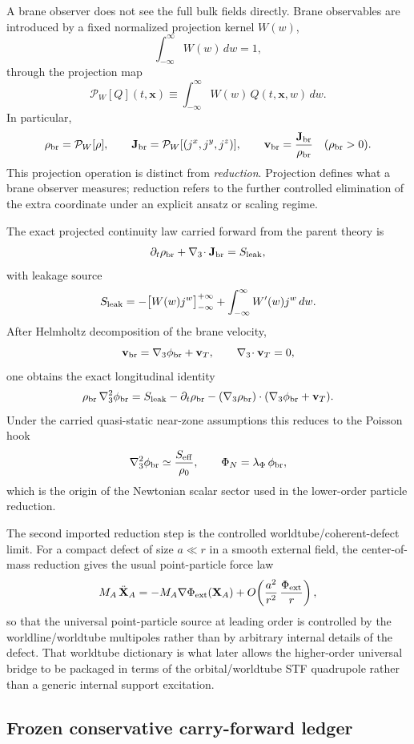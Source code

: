 \documentclass[11pt]{article}
\begin{document}
A brane observer does not see the full bulk fields directly.  Brane observables
are introduced by a fixed normalized projection kernel $W(w)$,
\[
\int_{-\infty}^{\infty} W(w)\,dw = 1,
\]
through the projection map
\[
\mathcal P_W[Q](t,\mathbf{x})
\equiv
\int_{-\infty}^{\infty} W(w)\,Q(t,\mathbf{x},w)\,dw.
\]
In particular,
\[
\rho_{\rm br}=\mathcal P_W[\rho],
\qquad
\mathbf J_{\rm br}=\mathcal P_W[(j^x,j^y,j^z)],
\qquad
\mathbf v_{\rm br}=\frac{\mathbf J_{\rm br}}{\rho_{\rm br}}
\quad (\rho_{\rm br}>0).
\]
This projection operation is distinct from \emph{reduction}.  Projection defines
what a brane observer measures; reduction refers to the further controlled
elimination of the extra coordinate under an explicit ansatz or scaling regime.

The exact projected continuity law carried forward from the parent theory is
\[
\partial_t\rho_{\rm br}+\nabla_3\!\cdot\mathbf J_{\rm br}=S_{\rm leak},
\]
with leakage source
\[
S_{\rm leak}
=
-\bigl[W(w)j^w\bigr]_{-\infty}^{+\infty}
+
\int_{-\infty}^{\infty} W'(w)j^w\,dw.
\]
After Helmholtz decomposition of the brane velocity,
\[
\mathbf v_{\rm br}=\nabla_3\phi_{\rm br}+\mathbf v_T,
\qquad
\nabla_3\!\cdot\mathbf v_T=0,
\]
one obtains the exact longitudinal identity
\[
\rho_{\rm br}\,\nabla_3^2\phi_{\rm br}
=
S_{\rm leak}
-\partial_t\rho_{\rm br}
-(\nabla_3\rho_{\rm br})\cdot(\nabla_3\phi_{\rm br}+\mathbf v_T).
\]
Under the carried quasi-static near-zone assumptions this reduces to the Poisson
hook
\[
\nabla_3^2\phi_{\rm br}\simeq \frac{S_{\rm eff}}{\rho_0},
\qquad
\Phi_N=\lambda_\Phi\,\phi_{\rm br},
\]
which is the origin of the Newtonian scalar sector used in the lower-order
particle reduction.

The second imported reduction step is the controlled worldtube/coherent-defect
limit.  For a compact defect of size $a\ll r$ in a smooth external field, the
center-of-mass reduction gives the usual point-particle force law
\[
M_A\,\ddot{\mathbf X}_A
=
-M_A\nabla\Phi_{\rm ext}(\mathbf X_A)
+O\!\left(\frac{a^2}{r^2}\,\frac{\Phi_{\rm ext}}{r}\right),
\]
so that the universal point-particle source at leading order is controlled by
the worldline/worldtube multipoles rather than by arbitrary internal details of
the defect.  That worldtube dictionary is what later allows the higher-order
universal bridge to be packaged in terms of the orbital/worldtube STF
quadrupole rather than a generic internal support excitation.

\subsection{Frozen conservative carry-forward ledger}
\label{sec:dict-carry}
\end{document}

